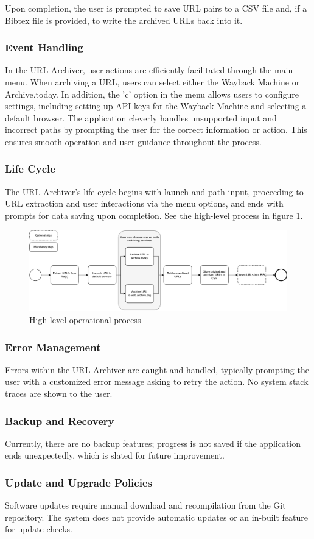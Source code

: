 Upon completion, the user is prompted to save URL pairs to a CSV file and, if a Bibtex file is provided, to write the archived URLs back into it. 


\subsubsection{Event Handling}
In the URL Archiver, user actions are efficiently facilitated through the main menu. When archiving a URL, users can select either the Wayback Machine or Archive.today. In addition, the 'c' option in the menu allows users to configure settings, including setting up API keys for the Wayback Machine and selecting a default browser. The application cleverly handles unsupported input and incorrect paths by prompting the user for the correct information or action. This ensures smooth operation and user guidance throughout the process.

\subsubsection{Life Cycle}
The URL-Archiver’s life cycle begins with launch and path input, proceeding to URL extraction and user interactions via the menu options, and ends with prompts for data saving upon completion. See the high-level process in figure \ref{fig:hl_operational_process}.

\begin{figure}[b]
	\includegraphics[width=1\textwidth]{./diagrams/process_model-simple-horizontal.pdf}
	\centering
	\caption{High-level operational process}
	\label{fig:hl_operational_process}
\end{figure}

\subsubsection{Error Management}
Errors within the URL-Archiver are caught and handled, typically prompting the user with a customized error message asking to retry the action. No system stack traces are shown to the user.

\subsubsection{Backup and Recovery}
Currently, there are no backup features; progress is not saved if the application ends unexpectedly, which is slated for future improvement.

\subsubsection{Update and Upgrade Policies}
Software updates require manual download and recompilation from the Git repository. The system does not provide automatic updates or an in-built feature for update checks.